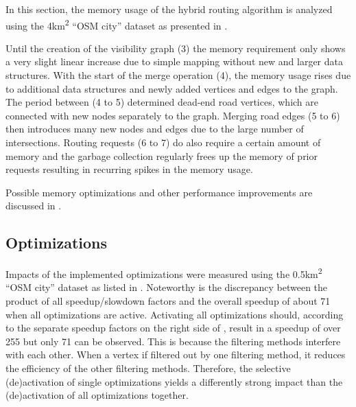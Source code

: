 		In this section, the memory usage of the hybrid routing algorithm is analyzed using the 4km\textsuperscript{2} \enquote{OSM city} dataset as presented in .
		
		Until the creation of the visibility graph (3) the memory requirement only shows a very slight linear increase due to simple mapping without new and larger data structures.
		With the start of the merge operation (4), the memory usage rises due to additional data structures and newly added vertices and edges to the graph.
		The period between (4 to 5) determined dead-end road vertices, which are connected with new nodes separately to the graph.
		Merging road edges (5 to 6) then introduces many new nodes and edges due to the large number of intersections.
		Routing requests (6 to 7) do also require a certain amount of memory and the garbage collection regularly frees up the memory of prior requests resulting in recurring spikes in the memory usage.
		
		Possible memory optimizations and other performance improvements are discussed in .
		
	\subsection{Optimizations}
	
		Impacts of the implemented optimizations were measured using the 0.5km\textsuperscript{2} \enquote{OSM city} dataset as listed in .
		Noteworthy is the discrepancy between the product of all speedup/slowdown factors and the overall speedup of about 71 when all optimizations are active.
		Activating all optimizations should, according to the separate speedup factors on the right side of , result in a speedup of over 255 but only 71 can be observed.
		This is because the filtering methods interfere with each other.
		When a vertex if filtered out by one filtering method, it reduces the efficiency of the other filtering methods.
		Therefore, the selective (de)activation of single optimizations yields a differently strong impact than the (de)activation of all optimizations together.
		
